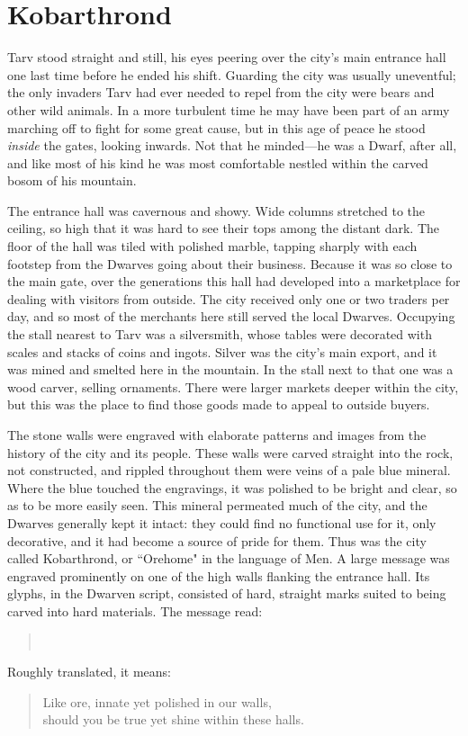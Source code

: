 \chapter{Kobarthrond}
Tarv stood straight and still, his eyes peering over the city's main entrance hall one last time before he ended his shift.  Guarding the city was usually uneventful; the only invaders Tarv had ever needed to repel from the city were bears and other wild animals.  In a more turbulent time he may have been part of an army marching off to fight for some great cause, but in this age of peace he stood \emph{inside} the gates, looking inwards.  Not that he minded---he was a Dwarf, after all, and like most of his kind he was most comfortable nestled within the carved bosom of his mountain.

The entrance hall was cavernous and showy.  Wide columns stretched to the ceiling, so high that it was hard to see their tops among the distant dark.  The floor of the hall was tiled with polished marble, tapping sharply with each footstep from the Dwarves going about their business.  Because it was so close to the main gate, over the generations this hall had developed into a marketplace for dealing with visitors from outside.  The city received only one or two traders per day, and so most of the merchants here still served the local Dwarves.  Occupying the stall nearest to Tarv was a silversmith, whose tables were decorated with scales and stacks of coins and ingots.  Silver was the city's main export, and it was mined and smelted here in the mountain.  In the stall next to that one was a wood carver, selling ornaments.  There were larger markets deeper within the city, but this was the place to find those goods made to appeal to outside buyers.

The stone walls were engraved with elaborate patterns and images from the history of the city and its people.  These walls were carved straight into the rock, not constructed, and rippled throughout them were veins of a pale blue mineral.  Where the blue touched the engravings, it was polished to be bright and clear, so as to be more easily seen.  This mineral permeated much of the city, and the Dwarves generally kept it intact: they could find no functional use for it, only decorative, and it had become a source of pride for them.  Thus was the city called Kobarthrond, or ``Orehome" in the language of Men.  A large message was engraved prominently on one of the high walls flanking the entrance hall.  Its glyphs, in the Dwarven script, consisted of hard, straight marks suited to being carved into hard materials.  The message read:
\begin{verse}
\\
\end{verse}
Roughly translated, it means:
\begin{verse}
Like ore, innate yet polished in our walls,\\
should you be true yet shine within these halls.
\end{verse}


